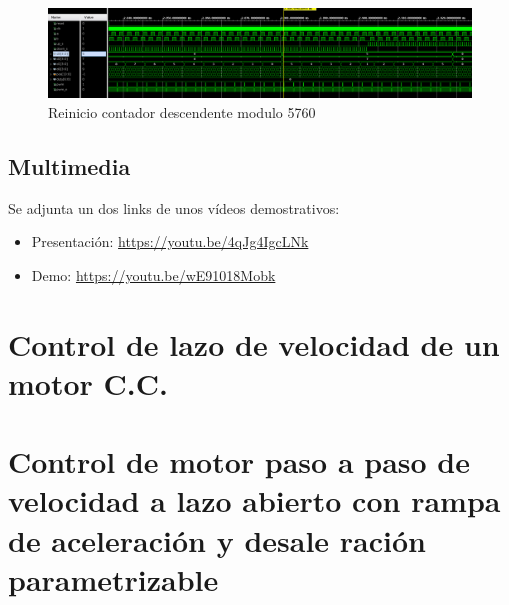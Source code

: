 \documentclass[11pt, a4paper]{article}
\begin{document}
		\begin{figure}[H]
			\centering
			\includegraphics[width=\textwidth]{Imagenes/sim_down.png}
			\caption{Reinicio contador descendente modulo 5760}
			\label{fig:cont_down}
		\end{figure} 

		\subsection{Multimedia}
		Se adjunta un dos links de unos vídeos demostrativos: 
		\begin{itemize}
			\item Presentación: \url{https://youtu.be/4qJg4IgcLNk}
			\item Demo: \url{https://youtu.be/wE91018Mobk}
		\end{itemize}
	\section{Control de lazo de velocidad de un motor C.C.}
	\section{Control de motor paso a paso de velocidad a lazo abierto con rampa de aceleración y desale ración parametrizable}
\end{document}
